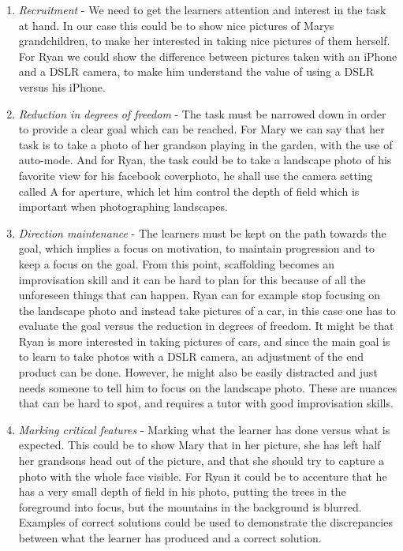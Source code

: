 \begin{enumerate}
\item{} \emph{Recruitment} - We need to get the learners attention and interest in the task at hand. In our case this could be to show nice pictures of Marys grandchildren, to make her interested in taking nice pictures of them herself. For Ryan we could show the difference between pictures taken with an iPhone and a DSLR camera, to make him understand the value of using a DSLR versus his iPhone.
\item{} \emph{Reduction in degrees of freedom} - The task must be narrowed down in order to provide a clear goal which can be reached. For Mary we can say that her task is to take a photo of her grandson playing in the garden, with the use of auto-mode. And for Ryan, the task could be to take a landscape photo of his favorite view for his facebook coverphoto, he shall use the camera setting called A for aperture, which let him control the depth of field which is important when photographing landscapes. 
\item{} \emph{Direction maintenance} - The learners must be kept on the path towards the goal, which implies a focus on motivation, to maintain progression and to keep a focus on the goal. From this point, scaffolding becomes an improvisation skill and it can be hard to plan for this because of all the unforeseen things that can happen. Ryan can for example stop focusing on the landscape photo and instead take pictures of a car, in this case one has to evaluate the goal versus the reduction in degrees of freedom. It might be that Ryan is more interested in taking pictures of cars, and since the main goal is to learn to take photos with a DSLR camera, an adjustment of the end product can be done. However, he might also be easily distracted and just needs someone to tell him to focus on the landscape photo. These are nuances that can be hard to spot, and requires a tutor with good improvisation skills.
\item{} \emph{Marking critical features} - Marking what the learner has done versus what is expected. This could be to show Mary that in her picture, she has left half her grandsons head out of the picture, and that she should try to capture a photo with the whole face visible. For Ryan it could be to accenture that he has a very small depth of field in his photo, putting the trees in the foreground into focus, but the mountains in the background is blurred. Examples of correct solutions could be used to demonstrate the discrepancies between what the learner has produced and a correct solution.

\end{enumerate}
